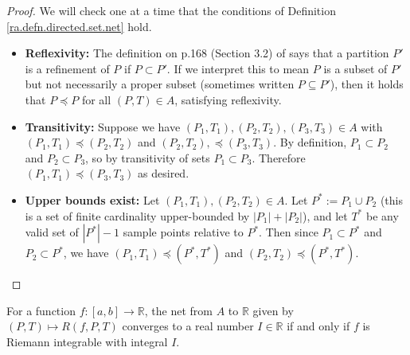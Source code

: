 \begin{proof}
We will check one at a time that the conditions of Definition \ref{ra.defn.directed.set.net} hold.

\begin{itemize}

\item \textbf{Reflexivity:} The definition on p.168 (Section 3.2) of \citet{pugh2015real} says that a partition \(P'\) is a refinement of \(P\) if \(P \subset P'\). If we interpret this to mean \(P\) is a subset of \(P'\) but not necessarily a proper subset (sometimes written \(P \subseteq P'\)), then it holds that \(P \preceq P\) for all \((P, T) \in A\), satisfying reflexivity. 

\item \textbf{Transitivity:} Suppose we have \((P_1, T_1), (P_2, T_2), (P_3, T_3) \in A\) with \((P_1, T_1) \preceq (P_2, T_2)\) and \((P_2, T_2), \preceq (P_3, T_3)\). By definition, \(P_1 \subset P_2\) and \(P_2 \subset P_3\), so by transitivity of sets \(P_1 \subset P_3\). Therefore \((P_1, T_1) \preceq (P_3, T_3)\) as desired.


\item \textbf{Upper bounds exist:} Let \((P_1, T_1), (P_2, T_2) \in A\). Let \(P^* := P_1 \cup P_2\) (this is a set of finite cardinality upper-bounded by \(|P_1| + |P_2|\)), and let \(T^*\) be any valid set of \(|P^*| -1\) sample points relative to \(P^*\). Then since \(P_1 \subset P^*\) and \(P_2 \subset P^*\), we have \((P_1, T_1) \preceq (P^*, T^*)\) and \((P_2, T_2) \preceq (P^*, T^*)\).

\end{itemize}


\end{proof}






\begin{proposition}\label{ra.425b.hw1.2.c}
For a function $f: [a,b] \to \mathbb{R}$, the net from $A$ to $\mathbb{R}$ given by $(P,T) \mapsto R(f,P,T)$ converges to a real number $I \in \mathbb{R}$ if and only if $f$ is Riemann integrable with integral $I$.
\end{proposition}


